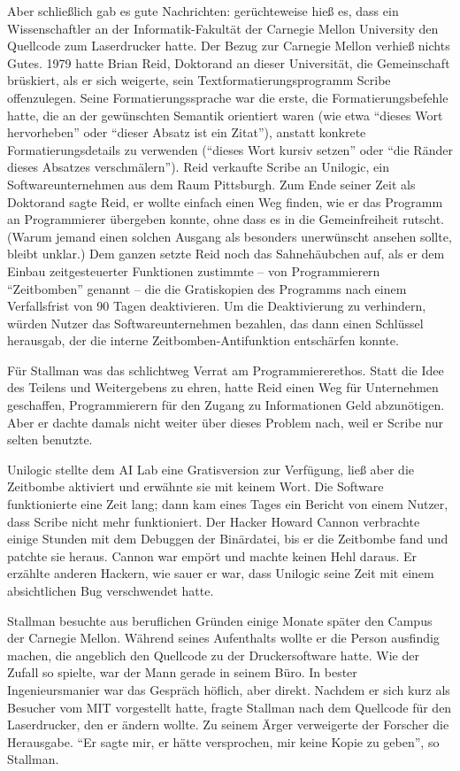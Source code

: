 Aber schließlich gab es gute Nachrichten: gerüchteweise hieß es, dass ein Wissenschaftler an der Informatik-Fakultät der Carnegie Mellon University den Quellcode zum Laserdrucker hatte. Der Bezug zur Carnegie Mellon verhieß nichts Gutes. 1979 hatte Brian Reid, Doktorand an dieser Universität, die Gemeinschaft brüskiert, als er sich weigerte, sein Textformatierungsprogramm Scribe offenzulegen. Seine Formatierungssprache war die erste, die Formatierungsbefehle hatte, die an der gewünschten Semantik orientiert waren (wie etwa "`dieses Wort hervorheben"' oder "`dieser Absatz ist ein Zitat"'), anstatt konkrete Formatierungsdetails zu verwenden ("`dieses Wort kursiv setzen"' oder "`die Ränder dieses Absatzes verschmälern"').
Reid verkaufte Scribe an Unilogic, ein Softwareunternehmen aus dem Raum Pittsburgh. Zum Ende seiner Zeit als Doktorand sagte Reid, er wollte einfach einen Weg finden, wie er das Programm an Programmierer übergeben konnte, ohne dass es in die Gemeinfreiheit rutscht. (Warum jemand einen solchen Ausgang als besonders unerwünscht ansehen sollte, bleibt unklar.) Dem ganzen setzte Reid noch das Sahnehäubchen auf, als er dem Einbau zeitgesteuerter Funktionen zustimmte – von Programmierern "`Zeitbomben"' genannt – die die Gratiskopien des Programms nach einem Verfallsfrist von 90 Tagen deaktivieren. Um die Deaktivierung zu verhindern, würden Nutzer das Softwareunternehmen bezahlen, das dann einen Schlüssel herausgab, der die interne Zeitbomben-Antifunktion entschärfen konnte.

Für Stallman was das schlichtweg Verrat am Programmiererethos. Statt die Idee des Teilens und Weitergebens zu ehren, hatte Reid einen Weg für Unternehmen geschaffen, Programmierern für den Zugang zu Informationen Geld abzunötigen. Aber er dachte damals nicht weiter über dieses Problem nach, weil er Scribe nur selten benutzte.

Unilogic stellte dem AI Lab eine Gratisversion zur Verfügung, ließ aber die Zeitbombe aktiviert und erwähnte sie mit keinem Wort. Die Software funktionierte eine Zeit lang; dann kam eines Tages ein Bericht von einem Nutzer, dass Scribe nicht mehr funktioniert. Der Hacker Howard Cannon verbrachte einige Stunden mit dem Debuggen der Binärdatei, bis er die Zeitbombe fand und patchte sie heraus. Cannon war empört und machte keinen Hehl daraus. Er erzählte anderen Hackern, wie sauer er war, dass Unilogic seine Zeit mit einem absichtlichen Bug verschwendet hatte.

Stallman besuchte aus beruflichen Gründen einige Monate später den Campus der Carnegie Mellon. Während seines Aufenthalts wollte er die Person ausfindig machen, die angeblich den Quellcode zu der Druckersoftware hatte. Wie der Zufall so spielte, war der Mann gerade in seinem Büro. In bester Ingenieursmanier war das Gespräch höflich, aber direkt. Nachdem er sich kurz als Besucher vom MIT vorgestellt hatte, fragte Stallman nach dem Quellcode für den Laserdrucker, den er ändern wollte. Zu seinem Ärger verweigerte der Forscher die Herausgabe. "`Er sagte mir, er hätte versprochen, mir keine Kopie zu geben"', so Stallman. 

